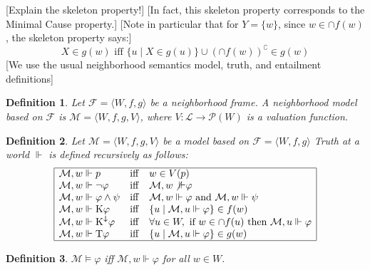 \documentclass{article}
\newcommand{\infixand}{\text{ and }}
\newcommand{\infixiff}{\text{ iff }}
\newcommand{\tmmathbf}[1]{\ensuremath{\boldsymbol{#1}}}
\newcommand{\tmop}[1]{\ensuremath{\operatorname{#1}}}
\newcommand{\tmtextbf}[1]{\text{{\bfseries{#1}}}}
\newtheorem{definition}{Definition}
\providecommand{\infixiff}{\mathbin{\text{ iff }}}
\newcommand{\Model}{\mathcal{M}}
\newcommand{\Lang}{\mathcal{L}}
\newcommand{\powerset}{\mathcal{P}}
\newcommand{\Know}{\tmmathbf{\text{K}}}
\newcommand{\Knownby}{\tmmathbf{\text{K}^{\downarrow}}}
\newcommand{\Typ}{\tmmathbf{\text{T}}}
\begin{document}
[Explain the skeleton property!] [In fact, this skeleton property corresponds
to the Minimal Cause property.] [Note in particular that for $Y = \{ w \}$,
since $w \in \cap f (w)$, the skeleton property says:]
\begin{equation}
  X \in g (w) \infixiff \{ u \mid X \in g (u) \} \cup (\cap f
  (w))^{\complement} \in g (w)
\end{equation}
[We use the usual neighborhood semantics model, truth, and entailment
definitions]

\begin{definition}
  {\cite[Definition 1.11]{pacuit2017neighborhood}} Let $\mathcal{F} = \langle
  W, f, g \rangle$ be a neighborhood frame. A neighborhood model based on
  $\mathcal{F}$ is $\Model = \langle W, f, g, V \rangle$, where $V : \Lang \to
  \powerset (W)$ is a valuation function.
\end{definition}

\begin{definition}
  {\cite[Definition 1.12]{pacuit2017neighborhood}} Let $\Model = \langle W, f,
  g, V \rangle$ be a model based on $\mathcal{F} = \langle W, f, g \rangle$
  Truth at a world $\Vdash$ is defined recursively as follows:
  \[ \begin{array}{|lll|}
       \hline
       \Model, w \Vdash p & \tmop{iff} & w \in V (p)\\
       \Model, w \Vdash \neg \varphi & \tmop{iff} & \Model, w \not{\Vdash}
       \varphi\\
       \Model, w \Vdash \varphi \wedge \psi & \tmop{iff} & \Model, w \Vdash
       \varphi \infixand \Model, w \Vdash \psi\\
       \Model, w \Vdash \Know \varphi & \tmop{iff} & \left\{ u \mid \Model, u
       \Vdash \varphi \right\} \in f (w)\\
       \Model, w \Vdash \Knownby \varphi & \tmop{iff} & \forall u \in W,
       \text{ if } w \in \cap f (u) \text{ then } \Model, u \Vdash \varphi\\
       \Model, w \Vdash \Typ \varphi & \tmop{iff} & \left\{ u \mid \Model, u
       \Vdash \varphi \right\} \in g (w)\\
       \hline
     \end{array} \]
\end{definition}

\begin{definition}
  {\cite[Definition 1.13]{pacuit2017neighborhood}} \tmtextbf{(Truth in a
  model)} $\Model \models \varphi$ iff $\Model, w \Vdash \varphi$ for all $w
  \in W$.
\end{definition}
\end{document}
